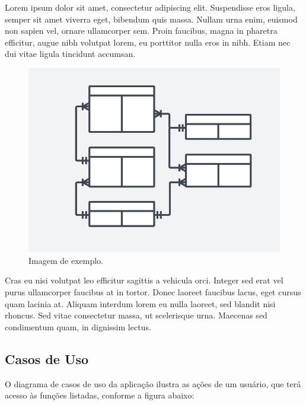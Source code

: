  Lorem ipsum dolor sit amet, consectetur adipiscing elit. Suspendisse eros ligula, semper sit amet viverra eget, bibendum quis massa. Nullam urna enim, euismod non sapien vel, ornare ullamcorper sem. Proin faucibus, magna in pharetra efficitur, augue nibh volutpat lorem, eu porttitor nulla eros in nibh. Etiam nec dui vitae ligula tincidunt accumsan.
 
\begin{figure}[!htb]
\centering
\caption{Imagem de exemplo.}
\includegraphics[width=\linewidth]{figuras/mer.png}
\end{figure}
 
 Cras eu nisi volutpat leo efficitur sagittis a vehicula orci. Integer sed erat vel purus ullamcorper faucibus at in tortor. Donec laoreet faucibus lacus, eget cursus quam lacinia at. Aliquam interdum lorem eu nulla laoreet, sed blandit nisi rhoncus. Sed vitae consectetur massa, ut scelerisque urna. Maecenas sed condimentum quam, in dignissim lectus. 
 
 \subsection{Casos de Uso}
O diagrama de casos de uso da aplicação ilustra as ações de um usuário, que terá acesso às funções listadas, conforme a figura abaixo:


